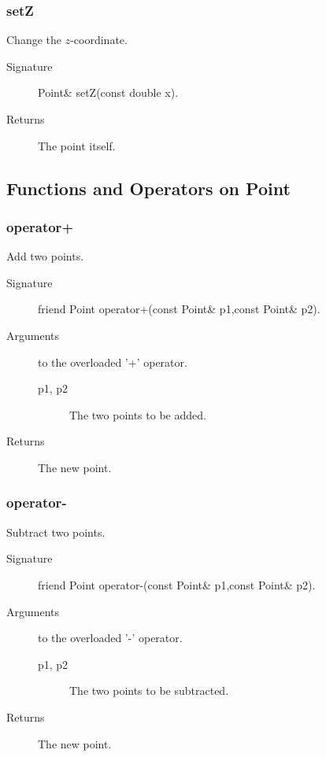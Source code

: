 \subsubsection{setZ}
Change the $z$-coordinate.
\begin{description}
  \item[Signature] Point\& setZ(const double x).
  \item[Returns] The point itself.
\end{description}

\subsection{Functions and Operators on Point}

\subsubsection{operator+}
Add two points.
 
\begin{description}
  \item[Signature] friend Point operator+(const Point\& p1,const
  Point\& p2).
  \item[Arguments] to the overloaded '+' operator.
    \begin{description}
      \item[p1, p2] The two points to be added. 
    \end{description}
  \item[Returns] The new point.
\end{description}

\subsubsection{operator-}
Subtract two points.
\begin{description}
  \item[Signature] friend Point operator-(const Point\& p1,const
  Point\& p2).
  \item[Arguments] to the overloaded '-' operator.
    \begin{description}
      \item[p1, p2] The two points to be subtracted. 
    \end{description}
  \item[Returns] The new point.
\end{description}

